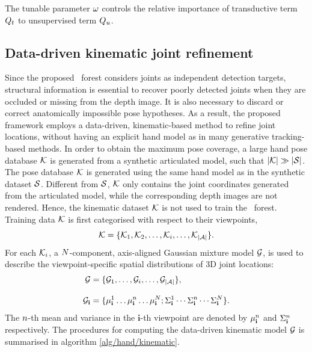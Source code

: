 The tunable parameter $\omega$ controls the relative importance of transductive term $Q_{t}$ to unsupervised term $Q_{u}$.  

\subsection{Data-driven kinematic joint refinement}

Since the proposed \STR\ forest considers joints as independent detection targets, structural information is essential to recover poorly detected joints when they are occluded or missing from the depth image. 
It is also necessary to discard or correct anatomically impossible pose hypotheses.    
As a result, the proposed framework employs a data-driven, kinematic-based method to refine joint locations, without having an explicit hand model as in many generative tracking-based methods. 
In order to obtain the maximum pose coverage, a large hand pose database $\mathcal{K}$ is generated from a synthetic articulated model, such that $|\mathcal{K}| \gg |\mathcal{S}|$. 
The pose database $\mathcal{K}$ is generated using the same hand model as in the synthetic dataset $\mathcal{S}$. Different from $\mathcal{S}$, $\mathcal{K}$ only contains the joint coordinates generated from the articulated model, while the corresponding depth images are not rendered. 
Hence, the kinematic dataset $\mathcal{K}$ is not used to train the \STR\ forest. 
Training data $\mathcal{K}$ is first categorised with respect to their viewpoints,  
\begin{equation}
	\label{eqn/hand/datadrivenclassify} 
	\mathcal{K} = \{ \mathcal{K}_{1}, \mathcal{K}_{2}, \dots,  \mathcal{K}_{i}, \dots, \mathcal{K}_{|\mathcal{A}|}\}.
\end{equation}
For each $\mathcal{K}_{i}$, a $N$-component, axis-aligned Gaussian mixture model $\mathcal{G}$, is used to describe the viewpoint-specific spatial distributions of 3D joint locations:
\begin{equation}
	\begin{aligned}
		\mathcal{G} & = \{ \mathcal{G}_{1}, \dots, \mathcal{G}_{i}, \dots, \mathcal{G}_{|\mathcal{A}|} \}, \\[3mm] 
		\mathcal{G}_{\mathbf{i}} & = \{\mu_{\mathbf{i}}^{1}\dots\mu_{\mathbf{i}}^{n}\dots\mu_{\mathbf{i}}^{N};\Sigma_{\mathbf{i}}^{1}\cdots\Sigma_{\mathbf{i}}^{n}\cdots\Sigma_{\mathbf{i}}^{N}\}.
	\end{aligned}
\end{equation}
The $n$-th mean and variance in the $\mathbf{i}$-th viewpoint are denoted by $\mu_{\mathbf{i}}^{n}$ and $\Sigma_{\mathbf{i}}^{n}$ respectively. The procedures for computing the data-driven kinematic model $\mathcal{G}$ is summarised in algorithm \ref{alg/hand/kinematic}. 

